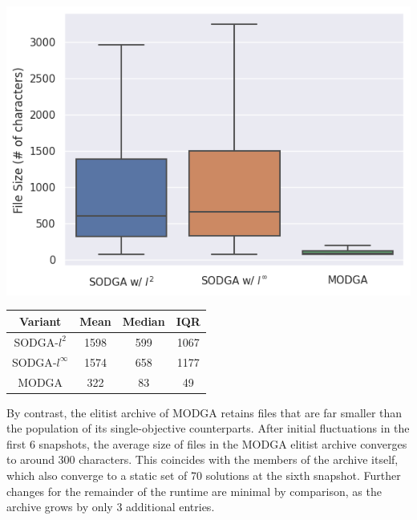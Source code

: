 \begin{minipage}{\textwidth}
\vspace{0.25cm}
  \begin{minipage}[b]{0.49\textwidth}
    \centering
    \includegraphics[scale=0.4]{img/rq1-2/rq1-2file-size-dist.png}
    \label{fig:rq1-2size-dist}
  \end{minipage}
  \hfill
  \begin{minipage}[b]{0.49\textwidth}
    \centering
\begin{tabular}{c|ccc}
    Variant & Mean & Median & \gls{IQR}\\
    \midrule
    \gls{SODGA}-$l^2$ & 1598 & 599 & 1067\\
    \gls{SODGA}-$l^\infty$ & 1574 & 658 & 1177\\
    \gls{MODGA} & 322 & 83 & 49\\
\end{tabular}
\vfill
  \label{tab:rq1-2size-dist}
\end{minipage}
\vspace{0.25cm}
\end{minipage}

By contrast, the elitist archive of \gls{MODGA} retains files that
are far smaller than the population of its single-objective counterparts.
After initial fluctuations in the first 6 snapshots, the average
size of files in the \gls{MODGA} elitist archive
converges to around 300 characters.
This coincides with the members of the archive itself,
which also converge to a static set of 70 solutions at the sixth snapshot.
Further changes for the remainder of the runtime are minimal by comparison,
as the archive grows by only 3 additional entries.

